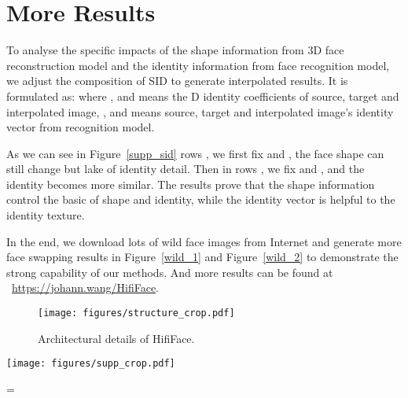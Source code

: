 \documentclass{article}
\begin{document}
\section*{More Results} 

To analyse the specific impacts of the shape information from 3D face reconstruction model and the identity information from face recognition model, we adjust the composition of SID to generate interpolated results. It is formulated as:
where ,  and  means the D identity coefficients of source, target and interpolated image, ,  and  means source, target and interpolated image's identity vector from recognition model. 

As we can see in Figure~\ref{supp_sid} rows , we first fix  and , the face shape can still change but lake of identity detail. Then in rows , we fix  and , and the identity becomes more similar. The results prove that the shape information control the basic of shape and identity, while the identity vector is helpful to the identity texture.



In the end, we download lots of wild face images from Internet
and generate more face swapping results in Figure~\ref{wild_1} and Figure~\ref{wild_2} to demonstrate the strong capability of our methods. And more results can be found at{~\color{magenta} ~\url{https://johann.wang/HifiFace}}. 



\begin{figure}[t] 
\begin{center} 
\texttt{[image: figures/structure\_crop.pdf]} 
\end{center} 
\caption{Architectural details of HifiFace.}
\label{arch} 
\end{figure}



\newpage

\begin{figure*}[t] 
\begin{center} 
\texttt{[image: figures/supp\_crop.pdf]} 
\end{center} 
\caption{More results on high resolution wild faces. 
The face in the target image is replaced by the face in the source image.}
\label{wild_1} 
\end{figure*}


\newpage
\begin{figure*}[t] 
\hsize=\textwidth
\centering
{}



\caption{Some results on high quality real world photos. 
The face in the target image is replaced by the face in the source image. This is to show that the faces generated by our method can be very naturally integrated into high-resolution shot real world scenes.} 
\label{wild_2}
\end{figure*}
\end{document}
